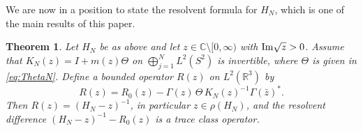 \documentclass[a4paper,11pt]{article}
\numberwithin{equation}{section}
\def\re{\mathbb{R}}
\def\co{\mathbb{C}}
\renewcommand{\Im}{\text{{\rm Im}}}
\newtheorem{thm}{Theorem}
\theoremstyle{definition}
\theoremstyle{remark}
\begin{document}
We are now in a position to state the resolvent formula for $H_N$, 
which is one of the main results of this paper.
%
\begin{thm}\label{thm:elem-res}
Let $H_N$ be as above and let $z\in\co\setminus[0,\infty)$ with $\Im\sqrt z>0$.
Assume that $K_N(z)=I+m(z)\Theta$ on $\bigoplus_{j=1}^N L^2(S^2)$ is invertible,
where $\Theta$ is given in \eqref{eq:ThetaN}.
Define a bounded operator $R(z)$ on $L^2(\re^3)$ by
\begin{equation}\label{eq:elem-res}
R(z)
=
R_0(z)
-
\Gamma(z)\,\Theta\,K_N(z)^{-1}\Gamma(\bar z)^{\ast}.
\end{equation}
Then $R(z)=(H_N-z)^{-1}$, in particular $z\in\rho(H_N)$, and the resolvent difference
$(H_N-z)^{-1}-R_0(z)$ is a trace class operator.
\end{thm}
\end{document}
